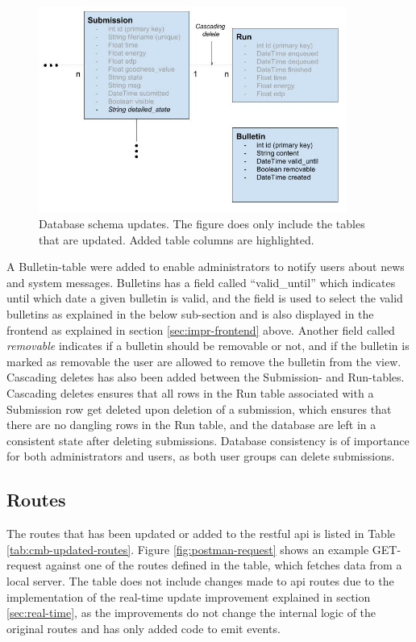 \begin{figure}
    \includegraphics[width=0.9\textwidth]{figs/updated_database_schema.jpg}
    \caption[Database schema updates]{Database schema updates. The figure does only include the tables that are updated. Added table columns are highlighted. }
    \label{fig:updated-database-schema}
\end{figure}

A Bulletin-table were added to enable administrators to notify users about news and system messages. Bulletins has a field called ``valid\_until'' which indicates until which date a given bulletin is valid, and the field is used to select the valid bulletins as explained in the below sub-section and is also displayed in the frontend as explained in section \ref{sec:impr-frontend} above. Another field called \textit{removable} indicates if a bulletin should be removable or not, and if the bulletin is marked as removable the user are allowed to remove the bulletin from the view. \\

Cascading deletes has also been added between the Submission- and Run-tables. Cascading deletes ensures that all rows in the Run table associated with a Submission row get deleted upon deletion of a submission, which ensures that there are no dangling rows in the Run table, and the database are left in a consistent state after deleting submissions. Database consistency is of importance for both administrators and users, as both user groups can delete submissions.

\subsection{Routes}
The routes that has been updated or added to the \gls{rest}ful \gls{api} is listed in Table \ref{tab:cmb-updated-routes}. Figure \ref{fig:postman-request} shows an example GET-request against one of the routes defined in the table, which fetches data from a local server. The table does not include changes made to \gls{api} routes due to the implementation of the real-time update improvement explained in section \ref{sec:real-time}, as the improvements do not change the internal logic of the original routes and has only added code to emit events. \\

